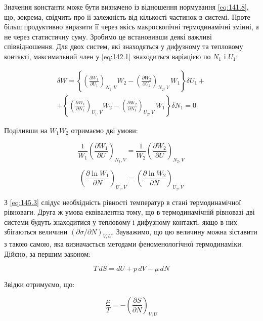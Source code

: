 Значення константи може бути визначено із відношення нормування \eqref{eq:141.8}, що, зокрема, свідчить про її залежність від кількості частинок в системі. Проте більш продуктивно виразити її через якісь макроскопічні термодинамічні змінні, а не через статистичну суму. Зробимо це встановивши деякі важливі співвідношення. Для двох систем, які знаходяться у дифузному та тепловому контакті, максимальний член у \eqref{eq:142.1} знаходиться варіацією по $N_1$ і $U_1$:

\begin{multline}
	\delta W=\left\{\left(\frac{\partial W_1}{\partial U_1}\right)_{N_1,V}W_2-\left(\frac{\partial W_2}{\partial U_2}\right)_{N_2,V\ }W_1\right\}\delta U_1+ \\ +\left\{\left(\frac{\partial W_1}{\partial N_1}\right)_{U_1,V}W_2-\left(\frac{\partial W_2}{\partial N_1}\right)_{U_2,V\ }W_1\right\}\delta N_1=0
	\label{eq:145.2}
\end{multline}

Поділивши на $W_1 W_2$ отримаємо дві умови:

\begin{equation}
	{\frac{1}{W_1}\left(\frac{\partial W_1}{\partial U}\right)}_{N_1,V}=\frac{1}{W_2}\left(\frac{\partial W_2}{\partial U}\right)_{N_2,V\ }
	\label{eq:145.3}
\end{equation}

\begin{equation}
	\left(\frac{\partial\ln{W_1}}{\partial N}\right)_{U_1,V}=\left(\frac{\partial\ln{W_2}}{\partial N}\right)_{U_2,V}
	\label{eq:145.4}
\end{equation}

З \eqref{eq:145.3} слідує необхідність рівності температур в стані термодинамічної рівноваги. Друга ж умова еквівалентна тому, що в термодинамічній рівновазі дві системи будуть знаходитися у тепловому і дифузному контакті, якщо в них збігаються величини $(\partial \sigma / \partial N)_{V,U}$. Зауважимо, що цю величину можна зіставити з такою самою, яка визначається методами феноменологічної термодинаміки. Дійсно, за першим законом:

\begin{equation}
	T \, dS  = dU + p \, dV - \mu \, dN
	\label{eq:145.5}
\end{equation}

Звідки отримуємо, що:

\begin{equation}
	\frac{\mu}{T} = - \left( \frac{\partial S}{\partial N} \right)_{V,U}
	\label{eq:145.6}
\end{equation}

